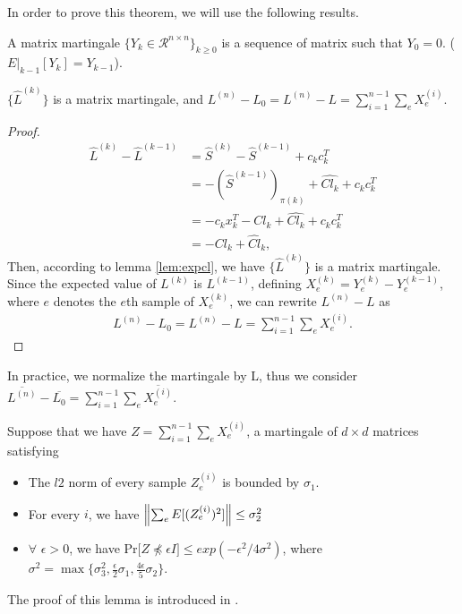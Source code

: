 \documentclass[11pt]{article}
\newcommand{\lnorm}[1]{\ensuremath{\overline{#1}}}
\begin{document}
In order to prove this theorem, we will use the following results.
\begin{definition}
   A matrix martingale $\{Y_k \in \mathcal{R}^{n \times n}\}_{k \geq 0}$ is a sequence of matrix such that
$Y_0=0$. ($E|_{k-1}[Y_k]=Y_{k-1}$). 
\end{definition}
\begin{lemma}
$\{\widehat{L}^{(k)}\}$ is a matrix martingale, and $ L^{(n)}-L_0= L^{(n)}-L
    =\sum_{i=1}^{n-1} \sum_{e} X^{(i)}_e$.
\end{lemma}
\begin{proof}
\begin{align*}
    \widehat{L}^{(k)}-\widehat{L}^{(k-1)} &= \widehat{S}^{(k)}-\widehat{S}^{(k-1)} + c_k c^T_k \\
    &= -(\widehat{S}^{(k-1)})_{\pi(k)}+ \widehat{Cl_k}+
    c_k c^T_k \\
    &=- c_k x^T_k - {Cl}_k+\widehat{Cl_k}+c_k c^T_k \\
    &=- Cl_k+\widehat{Cl}_k,
\end{align*}
Then, according to lemma \ref{lem:expcl}, we have $\{\widehat{L}^{(k)}\}$ is a matrix martingale. Since the expected value of $L^{(k)}$ is $L^{(k-1)}$, defining  $X^{(k)}_e=Y^{(k)}_e-Y^{(k-1)}_e$, where $e$ denotes the $e$th sample of $X^{(k)}_e$, we can rewrite 
$L^{(n)}-L$ as 
\begin{align*}
    L^{(n)}-L_0= L^{(n)}-L
    =\sum_{i=1}^{n-1} \sum_{e} X^{(i)}_e.
\end{align*}
\end{proof}
In practice, we normalize the martingale by L,
thus we consider $\lnorm{L^{(n)}}-\lnorm{L_0}
    =\sum_{i=1}^{n-1} \sum_{e} \lnorm{X^{(i)}_e}$.
\begin{lemma}\label{lem:4.3}
    Suppose that we have  $Z=\sum_{i=1}^{n-1} \sum_{e} X^{(i)}_e$, a martingale of $d \times d$ matrices satisfying
    \begin{itemize}
        \item The $l2$ norm of every sample $Z_e^{(i)}$ is bounded by $\sigma_1$.
        \item For every $i$, we have $\left\lVert \sum_{e} E[(Z_e^{(i)})^2] \right\rVert \leq \sigma^2_2$
        \item $\forall$ $\epsilon > 0$, we have 
        Pr[$Z \npreceq \epsilon I] \leq exp(-\epsilon^2 /4 \sigma ^2)$,
        where $\sigma^2 =\max{ \{ \sigma^2_3,
        \frac{\epsilon}{2}\sigma_1,\frac{4\epsilon}{5}\sigma_2} \}$.
    \end{itemize}
\end{lemma}
The proof of this lemma is introduced in \cite{Kyng16}.
\end{document}
